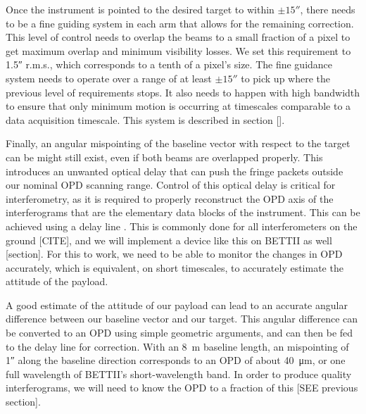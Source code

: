 Once the instrument is pointed to the desired target to within $\pm\ang{;;15}$, there needs to be a fine guiding system in each arm that allows for the remaining correction. This level of control needs to overlap the beams to a small fraction of a pixel to get maximum overlap and minimum visibility losses. We set this requirement to \ang{;;1.5} r.m.s., which corresponds to a tenth of a pixel's size. The fine guidance system needs to operate over a range of at least $\pm\ang{;;15}$ to pick up where the previous level of requirements stops. It also needs to happen with high bandwidth to ensure that only minimum motion is occurring at timescales comparable to a data acquisition timescale. This system is described in section [].

Finally, an angular mispointing of the baseline vector with respect to the target can be might still exist, even if both beams are overlapped properly. This introduces an unwanted optical delay that can push the fringe packets outside our nominal OPD scanning range. Control of this optical delay is critical for interferometry, as it is required to properly reconstruct the OPD axis of the interferograms that are the elementary data blocks of the instrument. This can be achieved using a delay line . This is commonly done for all interferometers on the ground [CITE], and we will implement a device like this on BETTII as well [section]. For this to work, we need to be able to monitor the changes in OPD accurately, which is equivalent, on short timescales, to accurately estimate the attitude of the payload.


%	
%

A good estimate of the attitude of our payload can lead to an accurate angular difference between our baseline vector and our target. This angular difference can be converted to an OPD using simple geometric arguments, and can then be fed to the delay line for correction. With an 8~m baseline length, an mispointing of \ang{;;1} along the baseline direction corresponds to an OPD of about \SI{40}{\um}, or one full wavelength of BETTII's short-wavelength band. In order to produce quality interferograms, we will need to know the OPD to a fraction of this [SEE previous section]. 



